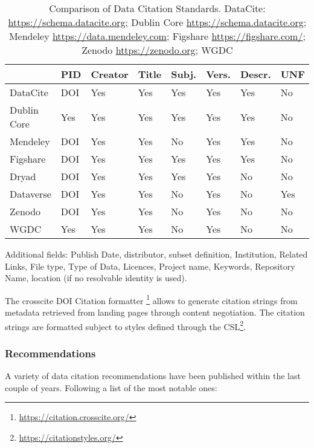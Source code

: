 \documentclass[letterpaper, parskip=half]{scrartcl}
\begin{document}
\begin{table}
    \caption{Comparison of Data Citation Standards. DataCite: \url{https://schema.datacite.org}; Dublin Core \url{https://schema.datacite.org}; Mendeley \url{https://data.mendeley.com}; Figshare \url{https://figshare.com/}; Zenodo \url{https://zenodo.org}; WGDC \citep{Rauber2015}} 
    \begin{tabularx}{\columnwidth}{lll lll ll}
        \toprule
                                & PID   & Creator & Title & Subj.   & Vers.   & Descr.    & UNF \\ \midrule
        DataCite                & DOI   & Yes     & Yes   & Yes     & Yes     & Yes       & No  \\
        Dublin Core             & Yes   & Yes     & Yes   & Yes     & Yes     & Yes       & No  \\ 
        Mendeley                & DOI   & Yes     & Yes   & No      & Yes     & Yes       & No  \\
        Figshare                & DOI   & Yes     & Yes   & Yes     & Yes     & Yes       & No  \\
        Dryad                   & DOI   & Yes     & Yes   & Yes     & Yes     & No        & No  \\
        Dataverse               & DOI   & Yes     & Yes   & No      & Yes     & No        & Yes \\
        Zenodo                  & DOI   & Yes     & Yes   & No      & Yes     & No        & No  \\
        WGDC                    & Yes   & Yes     & Yes   & No      & Yes     & No        & No  \\
        \bottomrule
    \end{tabularx}
\end{table}


Additional fields: 
Publish Date, distributor, subset definition, Institution, Related Links, File type, Type of Data, Licences, Project name, Keywords, Repository Name, location (if no resolvable identity is used).

The crosscite DOI Citation formatter \footnote{\url{https://citation.crosscite.org/}} allows to generate citation strings from metadata retrieved from landing pages through content negotiation.
The citation strings are formatted subject to styles defined through the \gls{CSL}\footnote{\url{https://citationstyles.org/}}.



\subsubsection{Recommendations}
A variety of data citation recommendations have been published within the last couple of years.
Following a list of the most notable ones:
\end{document}
